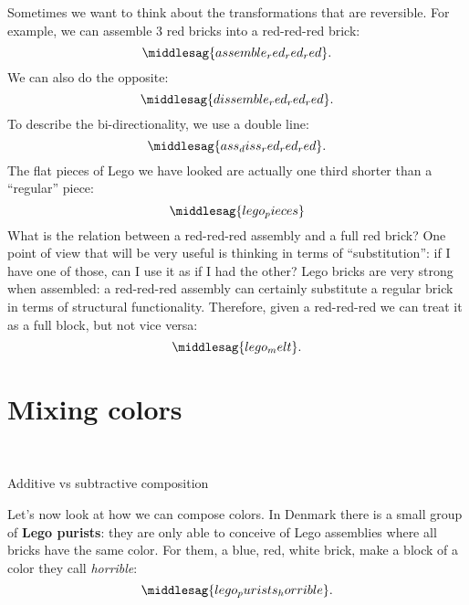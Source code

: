 Sometimes we want to think about the transformations that are reversible.
For example, we can assemble 3 red bricks into a red-red-red brick:
%
\begin{equation}
	\middlesag{assemble_red_red_red}.
\end{equation}
%
We can also do the opposite:
%
\begin{equation}
	\middlesag{dissemble_red_red_red}.
\end{equation}
%
To describe the bi-directionality, we use a double line:
%
\begin{equation}
	\middlesag{ass_diss_red_red_red}.
\end{equation}
%
The flat pieces of Lego we have looked are actually one third shorter than a ``regular'' piece:
%
\begin{equation}
	\middlesag{lego_pieces}
\end{equation}
%
What is the relation between a red-red-red assembly and a full red brick?
One point of view that will be very useful is thinking in terms of ``substitution'': if I have one of those, can I use it as if I had the other?
Lego bricks are very strong when assembled: a red-red-red assembly can certainly substitute a regular brick in terms of structural functionality.
Therefore, given a red-red-red we can treat it as a full block, but not vice versa:
%
\begin{equation}
	\middlesag{lego_melt}.
\end{equation}

\section{Mixing colors}

\begin{marginfigure}
	\centering
	\\
	\caption{Additive vs subtractive composition}
\end{marginfigure}

Let's now look at how we can compose colors.
In Denmark there is a small group of \textbf{Lego purists}: they are only able to conceive of Lego assemblies where all bricks have the same color.
For them, a blue, red, white brick, make a block of a color they call \emph{horrible}:
%
\begin{equation}
	\middlesag{lego_purists_horrible}.
\end{equation}

